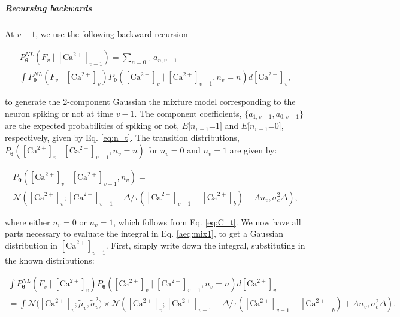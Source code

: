 \documentclass[10pt]{article}
\providecommand{\ve}[1]{\boldsymbol{#1}}
\providecommand{\ve}[1]{\boldsymbol{#1}}
\newcommand{\thetn}{\ve{\theta}}
\newcommand{\p}{P_{\thetn}}
\newcommand{\Ca}{[\text{Ca}^{2+}]}
\begin{document}
%

\subparagraph{Recursing backwards}

At $v-1$, we use the following backward recursion

\begin{multline} \label{aeq:mix1}
\p^{NL}(F_v \mid \Ca_{v-1}) = \sum_{n=0,1} a_{n,v-1} \\
\int \p^{NL}(F_v \mid \Ca_v) \p(\Ca_v \mid \Ca_{v-1}, n_v=n) d\Ca_v,
\end{multline}

\noindent to generate the 2-component Gaussian the mixture model corresponding to the neuron spiking or not at time $v-1$. The component coefficients, $\{a_{1,v-1},a_{0,v-1}\}$ are the expected probabilities of spiking or not, $E[n_{v-1}$=$1]$ and $E[n_{v-1}$=$0]$, respectively, given by Eq. \ref{eq:n_t}.  The transition distributions, $\p(\Ca_v \mid \Ca_{v-1}, n_v=n)$ for $n_v=0$ and $n_v=1$ are given by:

\begin{multline}
\p(\Ca_v \mid \Ca_{v-1}, n_v) =\\
\mathcal{N}(\Ca_v; \Ca_{v-1} -\Delta/\tau (\Ca_{v-1} - \Ca_b) + A n_v, \sigma_c^2 \Delta),
\end{multline}

\noindent where either $n_v=0$ or $n_v=1$, which follows from Eq. \ref{eq:C_t}. We now have all parts necessary to evaluate the integral in Eq. \ref{aeq:mix1}, to get a Gaussian distribution in $\Ca_{v-1}$.  First, simply write down the integral, substituting in the known distributions:

\begin{multline} \label{aeq:2n}
\int \p^{NL}(F_v \mid \Ca_v) \p(\Ca_v \mid \Ca_{v-1}, n_v=n) d\Ca_v
\\= \int \mathcal{N}\big(\Ca_v; \widetilde{\mu}_v, \widetilde{\sigma}_v^2\big)  \times \mathcal{N}(\Ca_v; \Ca_{v-1} -\Delta/\tau (\Ca_{v-1} - \Ca_b) + A n_v, \sigma_c^2 \Delta).
\end{multline}
\end{document}
